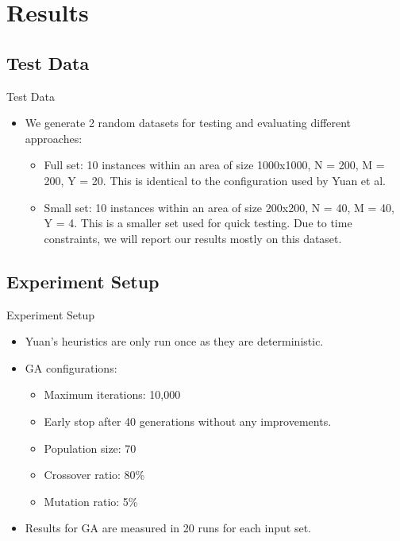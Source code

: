 \documentclass[main.tex]{subfiles}
\begin{document}
\section{Results}
\subsection{Test Data}
\begin{frame}{Test Data}
	\begin{itemize}
		\item { 
			We generate 2 random datasets for testing and evaluating different approaches:
			\begin{itemize}
				\item Full set: 10 instances within an area of size 1000x1000, N = 200, M = 200, Y = 20. This is identical to the configuration used by Yuan et al.
				\item Small set: 10 instances within an area of size 200x200, N = 40, M = 40, Y = 4. This is a smaller set used for quick testing. Due to time constraints, we will report our results mostly on this dataset.
			\end{itemize}
		}
	\end{itemize}
\end{frame}

\subsection{Experiment Setup}
\begin{frame}{Experiment Setup}
	\begin{itemize}
		\item Yuan's heuristics are only run once as they are deterministic.
		\item {
			GA configurations:
			\begin{itemize}
				\item Maximum iterations: 10,000
				\item Early stop after 40 generations without any improvements.
				\item Population size: 70
				\item Crossover ratio: 80\%
				\item Mutation ratio: 5\%
			\end{itemize}
		}
		\item Results for GA are measured in 20 runs for each input set.
	\end{itemize}
\end{frame}
\end{document}
